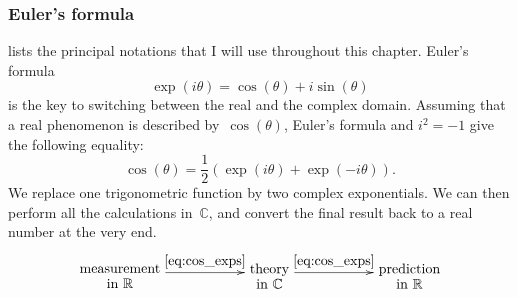 \subsubsection{Euler's formula}
 lists the principal notations that I will use throughout this chapter.
Euler's formula
\begin{equation}
    \exp(i \theta) = \cos(\theta) + i \sin(\theta)    \label{eq:euler_formula}
\end{equation}
is the key to switching between the real and the complex domain.
Assuming that a real phenomenon is described by~$\cos(\theta)$, Euler's formula and $i^2=-1$ give the following equality:
\begin{equation}
    \cos(\theta) = \frac{1}{2}(\exp(i \theta) + \exp(-i \theta)) \text{.}
    \label{eq:cos_exps}
\end{equation}
We replace one trigonometric function by two complex exponentials.
We can then perform all the calculations in~$\mathbb{C}$, and convert the final result back to a real number at the very end.
\begin{equation*}
    \xymatrix@M=4pt{
        \txt{measurement\\in $\mathbb{R}$}
        \ar[rr]^-*\txt{\cref{eq:cos_exps}}
        &&
        \txt{theory\\in $\mathbb{C}$}
        \ar[rr]^-*\txt{\cref{eq:cos_exps}}
        &&
        \txt{prediction\\in $\mathbb{R}$}
    }
\end{equation*}

